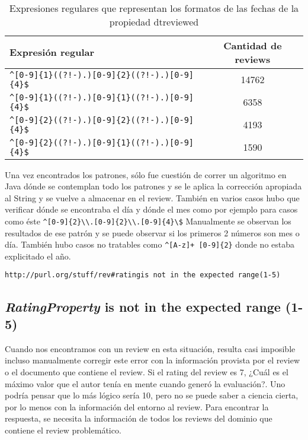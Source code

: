 \\
\begin{table}[h]
\begin{tabular}{| l | c |}\hline
Expresión regular & Cantidad de reviews\\\hline
\verb|^[0-9]{1}((?!-).)[0-9]{2}((?!-).)[0-9]{4}$| & 14762\\
\verb|^[0-9]{1}((?!-).)[0-9]{1}((?!-).)[0-9]{4}$| & 6358\\
\verb|^[0-9]{2}((?!-).)[0-9]{2}((?!-).)[0-9]{4}$| & 4193\\
\verb|^[0-9]{2}((?!-).)[0-9]{1}((?!-).)[0-9]{4}$| & 1590\\\hline
\end{tabular}
\caption{Expresiones regulares que representan los formatos de las fechas de la propiedad  dtreviewed}
\label{table:RegExpressionsDtreviewed}
\end{table}

Una vez encontrados los patrones, sólo fue cuestión de correr un algoritmo en Java dónde se contemplan todo los patrones y se 
le aplica la corrección apropiada al String y se vuelve a almacenar en el review.
También en varios casos hubo que verificar dónde se encontraba el día y dónde el mes como por ejemplo para casos como éste 
\verb|^[0-9]{2}\\.[0-9]{2}\\.[0-9]{4}\$|
Manualmente se observan los resultados de ese patrón y se puede observar si los primeros 2 números son mes o día.
También hubo casos no tratables como \verb|^[A-z]+ [0-9]{2}| donde no estaba explicitado el año.

\noindent\verb|http://purl.org/stuff/rev#ratingis not in the expected range(1-5)|\\


\subsection*{\textit{RatingProperty} is not in the expected range (1-5)}
Cuando nos encontramos con un review en esta situación, resulta casi imposible incluso manualmente corregir este error con la información 
provista por el review o el documento que contiene el review. Si el rating del review es 7, ¿Cuál es el máximo valor que el autor tenía en mente cuando  
generó la evaluación?. Uno podría pensar que lo más lógico sería 10, pero no se puede saber a ciencia cierta, por lo menos con la información del entorno al review.
Para encontrar la respuesta, se necesita la información de todos los reviews del dominio que contiene el review problemático. 

